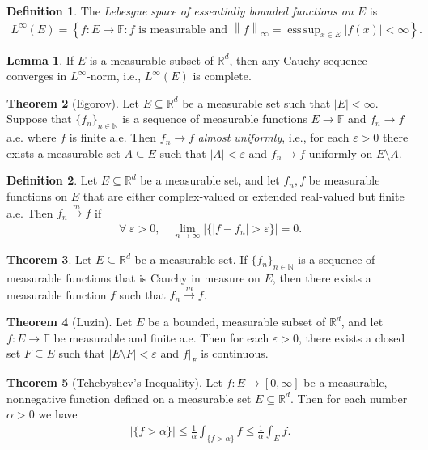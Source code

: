 \documentclass[a4paper,9pt]{extarticle}
\newcommand{\norm}[1]{\left\lVert#1\right\rVert}
\DeclareMathOperator*{\esssup}{ess\,sup}
\theoremstyle{definition}
\newtheorem{defin}{Definition}
\newtheorem{thm}{Theorem}
\newtheorem{lem}[thm]{Lemma}
\begin{document}
\begin{defin}
    The \emph{Lebesgue space of essentially bounded functions on $E$} is
    \begin{align*}
        L^\infty(E) = \left\{ f : E \to \mathbb{F} : f \text{ is measurable and } \norm{f}_\infty = \esssup_{x \in E} |f(x)| < \infty \right\}.
    \end{align*}
\end{defin}
\begin{lem}
    If $E$ is a measurable subset of $\mathbb{R}^d$, then any Cauchy sequence converges in $L^\infty$-norm, i.e., $L^\infty(E)$ is complete.
\end{lem}
\begin{thm}[Egorov]
    Let $E \subseteq \mathbb{R}^d$ be a measurable set such that $|E| < \infty$. Suppose that $\{f_n\}_{n \in \mathbb{N}}$ is a sequence of measurable functions $E \to \mathbb{F}$ and $f_n \to f$ a.e. where $f$ is finite a.e. Then $f_n \to f$ \emph{almost uniformly}, i.e., for each $\varepsilon > 0$ there exists a measurable set $A \subseteq E$ such that $|A| < \varepsilon$ and $f_n \to f$ uniformly on $E \setminus A$.
\end{thm}
\begin{defin}
    Let $E \subseteq \mathbb{R}^d$ be a measurable set, and let $f_n, f$ be measurable functions on $E$ that are either complex-valued or extended real-valued but finite a.e. Then $f_n \xrightarrow{m} f$ if
    \begin{align*}
        \forall\; \varepsilon > 0, \quad \lim_{n \to \infty} |\{|f - f_n| > \varepsilon \}| = 0.
    \end{align*}
\end{defin}
\begin{thm}
    Let $E \subseteq \mathbb{R}^d$ be a measurable set. If $\{f_n\}_{n \in \mathbb{N}}$ is a sequence of measurable functions that is Cauchy in measure on $E$, then there exists a measurable function $f$ such that $f_n \xrightarrow{m} f$.
\end{thm}
\begin{thm}[Luzin]
    Let $E$ be a bounded, measurable subset of $\mathbb{R}^d$, and let $f : E \to \mathbb{F}$ be measurable and finite a.e. Then for each $\varepsilon > 0$, there exists a closed set $F \subseteq E$ such that $|E \setminus F| < \varepsilon$ and $f|_F$ is continuous.
\end{thm}
\begin{thm}[Tchebyshev's Inequality]
    Let $f : E \to [0, \infty]$ be a measurable, nonnegative function defined on a measurable set $E \subseteq \mathbb{R}^d$. Then for each number $\alpha > 0$ we have
    \begin{align*}
        |\{ f > \alpha \}| \leq \frac{1}{\alpha} \int_{\{f > \alpha\}} f \leq \frac{1}{\alpha} \int_E f.
    \end{align*}
\end{thm}
\end{document}
